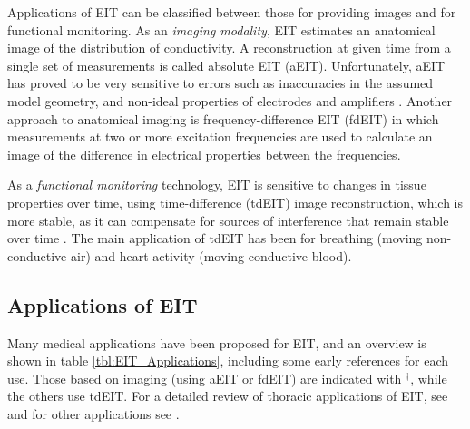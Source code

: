 \documentclass[10pt,journal]{IEEEtran}\def\TBLWIDA{15mm}\def\TBLWIDB{60mm}
\begin{document}
Applications of EIT can be classified between those for
providing images and for functional monitoring.
As an {\em imaging modality}, EIT estimates an anatomical
image of the distribution of conductivity. A reconstruction
at given time from a single
set of measurements is called absolute EIT (aEIT). Unfortunately,
aEIT has proved to be very sensitive to errors
such as inaccuracies in the assumed
model geometry, and non-ideal properties of electrodes
and amplifiers
 \cite{Adler2015Hard, Nissinen2009Errors}.
Another approach to anatomical imaging is frequency-difference
EIT (fdEIT) in which measurements at two or more excitation frequencies
are used to calculate an image of the difference
in electrical properties between the frequencies.

As a {\em functional monitoring} technology, EIT is sensitive
to changes in tissue properties over time, using
time-difference (tdEIT) image reconstruction, which 
is more stable,
as it can compensate for sources
of interference 
that remain stable over time \cite{Brown2003EIT}.
The main application of tdEIT 
has been for breathing (moving non-conductive
air) and heart activity (moving conductive blood).

\subsection{Applications of EIT}


Many medical applications have been proposed for EIT, and an
overview is shown in table \ref{tbl:EIT_Applications},
 including some early references for each use. 
Those based on imaging (using aEIT or fdEIT) are indicated with $^\dagger$, while
the others use tdEIT.
For a detailed review of thoracic applications of EIT, see \cite{Frerichs2017Chest} and
for other applications see \cite{Holder2004Book}.
\end{document}
